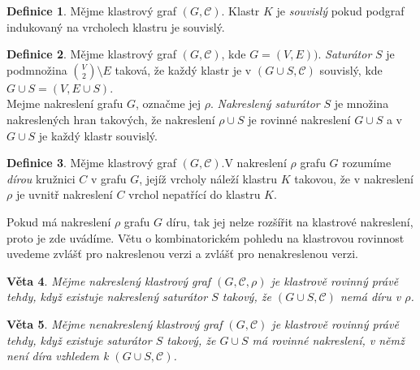 \documentclass[12pt,a4report]{report}
\newtheorem{theorem}{Věta}[chapter]
\theoremstyle{definition}
\newtheorem{defn}[theorem]{Definice}
\begin{document}
\begin{defn}
Mějme klastrový graf $(G,\mathcal C)$. Klastr $K$ je \textit{souvislý} pokud podgraf indukovaný na vrcholech klastru je souvislý. 
\end{defn}

\begin{defn}
Mějme klastrový graf $(G,\mathcal C)$, kde $G=(V,E))$. \textit{Saturátor} $S$ je podmnožina ${V \choose 2} \setminus E$ taková, že každý klastr je v $(G \cup S,\mathcal C)$ souvislý, kde $G \cup S = (V,E \cup S)$. \\
Mejme nakreslení grafu $G$, označme jej $\rho$. \textit{Nakreslený saturátor} $S$ je množina nakreslených hran takových, že nakreslení $\rho \cup S$ je rovinné nakreslení $G \cup S$ a v $G \cup S$ je každý klastr souvislý. 
\end{defn}

\begin{defn}
Mějme klastrový graf $(G,\mathcal C)$.V nakreslení $\rho$ grafu $G$ rozumíme \textit{dírou} kružnici $C$ v grafu $G$, jejíž vrcholy náleží klastru $K$ takovou, že v nakreslení $\rho$  je uvnitř nakreslení $C$ vrchol nepatřící do klastru $K$.
\end{defn}

Pokud má nakreslení $\rho$ grafu $G$ díru, tak jej nelze rozšířit na klastrové nakreslení, proto je zde uvádíme.
Větu o kombinatorickém pohledu na klastrovou rovinnost uvedeme zvlášť pro nakreslenou verzi a zvlášť pro nenakreslenou verzi.

\begin{theorem}Mějme nakreslený klastrový graf $(G,\mathcal C, \rho)$ je klastrově rovinný právě tehdy, když existuje nakreslený saturátor $S$ takový, že $(G \cup S,\mathcal C)$ nemá díru v $\rho$.
\end{theorem}

\begin{theorem}Mějme nenakreslený klastrový graf $(G,\mathcal C)$ je klastrově rovinný právě tehdy, když existuje saturátor $S$ takový, že $G \cup S$ má rovinné nakreslení, v němž není díra vzhledem k $(G \cup S,\mathcal C)$.
\end{theorem}
\end{document}
